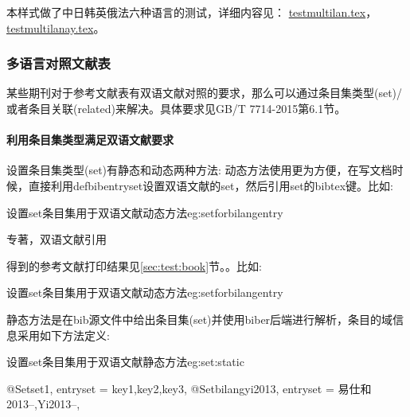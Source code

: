 本样式做了中日韩英俄法六种语言的测试，详细内容见：
\href{run:example/testmultilan.tex}{testmultilan.tex}，
\href{run:example/testmultilanay.tex}{testmultilanay.tex}。


\subsubsection{多语言对照文献表}

某些期刊对于参考文献表有双语文献对照的要求，那么可以通过条目集类型(set)/或者条目关联(related)来解决。具体要求见GB/T 7714-2015第6.1节。

\paragraph{利用条目集类型满足双语文献要求}

设置条目集类型(set)有静态和动态两种方法:
动态方法使用更为方便，在写文档时候，直接利用defbibentryset设置双语文献的set，然后引用set的bibtex键。比如:
\begin{example}{设置set条目集用于双语文献动态方法}{eg:setforbilangentry}
\begin{texlist}
专著，双语文献引用\cite{bilangyi2013}
\end{texlist}
\end{example}

得到的参考文献打印结果见\ref{sec:test:book}节。。比如:
\begin{example}{设置set条目集用于双语文献动态方法}{eg:setforbilangentry}
\end{example}


静态方法是在bib源文件中给出条目集(set)并使用biber后端进行解析，条目的域信息采用如下方法定义:
\begin{example}{设置set条目集用于双语文献静态方法}{eg:set:static}
\begin{texlist}
@Set{set1,
entryset = {key1,key2,key3},
}
@Set{bilangyi2013,
entryset = {易仕和2013--,Yi2013--},
}
\end{texlist}
\end{example}

